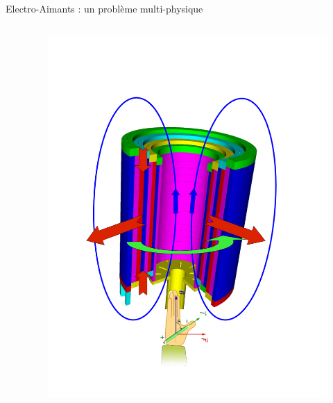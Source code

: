 \begin{frame}{Electro-Aimants : un problème multi-physique}
\begin{columns}[c]
\begin{column}{.7\linewidth}
    \end{column}
    \begin{column}{.42\linewidth}
      \vspace*{-0.5cm}
      \begin{figure}[H]
        \centering
        \includegraphics[scale=0.26]{Figures/cmi/Schema_Forces.pdf}
      \end{figure}
    \end{column}
  \end{columns}
\end{frame}

